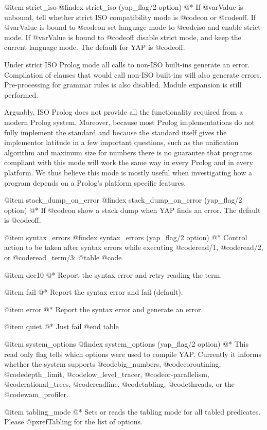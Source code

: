 {{{{{{{{@item strict_iso
@findex strict_iso (yap_flag/2 option)
@*
 If @var{Value} is unbound, tell whether strict ISO compatibility mode
is @code{on} or @code{off}. If @var{Value} is bound to @code{on} set
language mode to @code{iso} and enable strict mode. If @var{Value} is
bound to @code{off} disable strict mode, and keep the current language
mode. The default for YAP is @code{off}.

Under strict ISO Prolog mode all calls to non-ISO built-ins generate an
error. Compilation of clauses that would call non-ISO built-ins will
also generate errors. Pre-processing for grammar rules is also
disabled. Module expansion is still performed.

Arguably, ISO Prolog does not provide all the functionality required
from a modern Prolog system. Moreover, because most Prolog
implementations do not fully implement the standard and because the
standard itself gives the implementor latitude in a few important
questions, such as the unification algorithm and maximum size for
numbers there is no guarantee that programs compliant with this mode
will work the same way in every Prolog and in every platform. We thus
believe this mode is mostly useful when investigating how a program
depends on a Prolog's platform specific features.

@item  stack_dump_on_error
@findex stack_dump_on_error (yap_flag/2 option)
@*
If @code{on} show a stack dump when YAP finds an error. The default is
@code{off}.

@item  syntax_errors
@findex syntax_errors (yap_flag/2 option)
@*
Control action to be taken after syntax errors while executing @code{read/1},
@code{read/2}, or @code{read_term/3}:
@table @code

@item dec10
@*
Report the syntax error and retry reading the term.
 
@item fail
@*
Report the syntax error and fail (default).

@item error
@*
Report the syntax error and generate an error.

@item quiet
@*
Just fail
@end table

@item system_options
@findex system_options (yap_flag/2 option)
@* This read only flag tells which options were used to compile
YAP. Currently it informs whether the system supports @code{big_numbers},
@code{coroutining}, @code{depth_limit}, @code{low_level_tracer},
@code{or-parallelism}, @code{rational_trees}, @code{readline}, @code{tabling},
@code{threads}, or the @code{wam_profiler}.

@item tabling_mode
@* Sets or reads the tabling mode for all tabled predicates. Please
@pxref{Tabling} for the list of options.

}}}}}}}}
